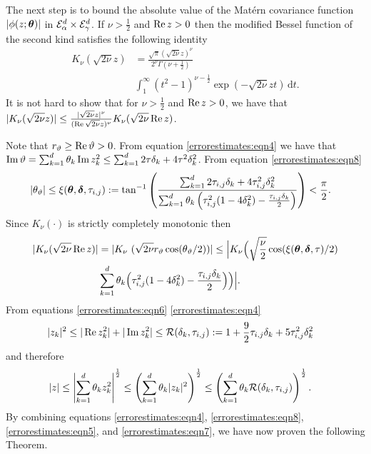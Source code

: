 \documentclass[11pt,final]{amsart}       %
\begin{document}
The next step is to bound the absolute value of the Mat\'{e}rn
covariance function $|\phi(z;\boldsymbol{\theta})|$ in ${\mathcal E}^{d}_{\alpha} \times
{\mathcal E}^{d}_{\gamma}$. If $\nu > \frac{1}{2}$ and $\mathop{\text{\rm Re}} z>0$ then the
modified Bessel function of the second kind satisfies the following
identity
\[
\begin{split}
K_{\nu}(\sqrt{2 \nu}z) &= \frac{\sqrt{\pi} (\sqrt{2 \nu}z)^{\nu}}{2^\nu
  \Gamma(\nu + \frac{1}{2})} \\
&
\int_{1}^{\infty} (t^2 - 1)^{\nu -
  \frac{1}{2}} \exp{(-\sqrt{2 \nu}zt)}\, \text{d}t.
\end{split}
\]
It is not hard to show that for $\nu > \frac{1}{2}$ and $\mathop{\text{\rm Re}} z >0$,
we have that $|K_{\nu}(\sqrt{2 \nu}z)| \leq \frac{|\sqrt{2
    \nu}z|^{\nu}}{(\mathop{\text{\rm Re}} \sqrt{2 \nu}z)^{\nu}} K_{\nu}(\sqrt{2 \nu}
\mathop{\text{\rm Re}} z)$.

Note that $r_{\vartheta} \geq \mathop{\text{\rm Re}} \vartheta > 0$.  From equation
\eqref{errorestimates:eqn4} we have that $\mathop{\text{\rm Im}} \vartheta =
\sum_{k=1}^{d} \theta_k \mathop{\text{\rm Im}} z^2_k \leq \sum_{k=1}^{d} 2 \tau
\delta_{k} + 4 \tau^2 \delta_{k}^2$.  From equation
\eqref{errorestimates:eqn8}
\[
\begin{split}
  |\theta_{\vartheta}|
  &\leq
\xi(\boldsymbol{\theta},\boldsymbol{\delta},\tau_{i,j}) := \tan^{-1}
\left(
\frac{
  \sum_{k=1}^{d} 2 \tau_{i,j}
\delta_{k} + 4 \tau^2_{i,j} \delta_{k}^2
}
{
\sum_{k=1}^{d} \theta_k 
  \left(
  \tau_{i,j}^2 (1 - 4 \delta_{k}^2) - \frac{\tau_{i,j}
    \delta_{k}}{2} \right)
}
\right)
< \frac{\pi}{2}.
\end{split}
\]
Since $K_{\nu}(\cdot)$ is strictly completely monotonic
\cite{Baricz2011} then
\begin{equation}
\begin{split}
  |K_{\nu}(\sqrt{2 \nu}\mathop{\text{\rm Re}} z)| &=
  |K_{\nu}\ (\sqrt{2 \nu}
  r_{\vartheta} \cos(\theta_{\vartheta}/2))
  | 
  \leq
  \Big| K_{\nu}\Big(\sqrt{\frac{\nu}{2}}
  \cos(\xi(\boldsymbol{\theta},\boldsymbol{\delta},\tau)/2) \\
  &
  \sum_{k=1}^{d} \theta_k 
  \Big(
  \tau_{i,j}^2 (1 - 4 \delta_{k}^2) - \frac{\tau_{i,j}
    \delta_{k}}{2} \Big)
  \Big) \Big|.
\end{split}
\label{errorestimates:eqn5}
\end{equation}
From equations \eqref{errorestimates:eqn6}
\eqref{errorestimates:eqn4} 
\[
\begin{split}
|z_k|^{2} &\leq |\mathop{\text{\rm Re}} z^2_k| + |\mathop{\text{\rm Im}} z^2_k|
\leq {\mathcal R}(\delta_k,\tau_{i,j})
:=
1 + \frac{9}{2}\tau_{i,j} \delta_{k} + 5 \tau^2_{i,j} \delta_{k}^2
\end{split}
\]
and therefore
\begin{equation}
\begin{split}
  |z|
  &\leq
\left|
\sum_{k=1}^{d} \theta_{k} z_k^{2} \right|^{\frac{1}{2}}
\leq
\left(
\sum_{k=1}^{d} \theta_{k} |z_k|^{2} \right)^{\frac{1}{2}}
\leq \left( \sum_{k=1}^{d} \theta_k {\mathcal R}(\delta_k,\tau_{i,j})
\right)^{\frac{1}{2}}.
\end{split}
\label{errorestimates:eqn7}
\end{equation}
By combining equations \eqref{errorestimates:eqn4},
\eqref{errorestimates:eqn8}, \eqref{errorestimates:eqn5}, and
\eqref{errorestimates:eqn7}, we have now proven the following Theorem.
\end{document}
